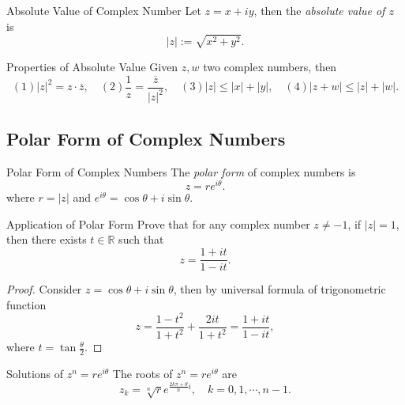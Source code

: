 \begin{definition}{Absolute Value of Complex Number}{}
  Let $z = x + iy$, then the \emph{absolute value of $z$} is
  \begin{equation}
    |z| := \sqrt{x^2 + y^2}.
  \end{equation}
\end{definition}

\begin{proposition}{Properties of Absolute Value}{}
  Given $z, w$ two complex numbers, then
  \begin{equation}
    (1) |z|^2 = z \cdot \overline{z}, \quad
    (2) \frac{1}{z} = \frac{\overline{z}}{|z|^2}, \quad
    (3) |z| \leq |x| + |y|, \quad
    (4) |z + w| \leq |z| + |w|.
  \end{equation}
\end{proposition}


\subsection{Polar Form of Complex Numbers}

\begin{definition}{Polar Form of Complex Numbers}{}
  The \emph{polar form} of complex numbers is
  \begin{equation}
    z = r e^{i\theta}.
  \end{equation}
  where $r = |z|$ and $e^{i\theta} = \cos \theta + i \sin \theta$.
\end{definition}

\begin{example}{Application of Polar Form}{}
  Prove that for any complex number $z \neq -1$, if $|z| = 1$,
  then there exists $t \in \mathbb{R}$ such that
  \begin{equation}
    z = \frac{1 + it}{1 - it}.
  \end{equation}
\end{example}

\begin{proof}
  Consider $z = \cos \theta + i \sin \theta$, then by universal formula of
  trigonometric function
  \begin{equation}
    z = \frac{1 - t^2}{1 + t^2} + \frac{2i t}{1 + t^2} = \frac{1+it}{1 - it},
  \end{equation}
  where $t = \tan \frac{\theta}{2}$.
\end{proof}

\begin{proposition}{Solutions of $z^n = re^{i\theta}$}{}
  The roots of $z^n = re^{i\theta}$ are
  \begin{equation}
    z_k = \sqrt[n]{r} e^{\frac{2k\pi + \theta}{n}i}, \quad k = 0,1,\cdots,n-1.
  \end{equation}
\end{proposition}

